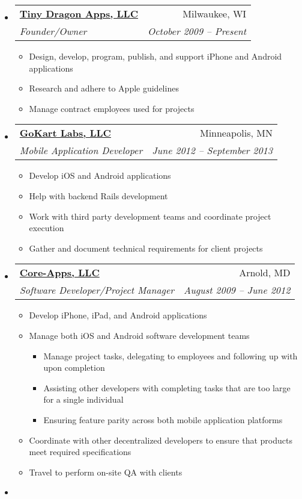 \documentclass[letterpaper,12pt]{article}
\makeatletter
\newcommand{\resitem}[1]{\item #1 \vspace{-2pt}}
\newcommand{\ressubheading}[4]{
      \begin{tabular*}{6.5in}{l@{\extracolsep{\fill}}r}
        \textbf{#1} & #2 \\
        \textit{#3} & \textit{#4} \\
      \end{tabular*}\vspace{-6pt}}
\makeatother
\begin{document}
\begin{itemize}
{\begin{itemize}
        \end{itemize}
         }
       \item
         \ressubheading{\href{http://itunes.apple.com/WebObjects/MZStore.woa/wa/viewArtist?id=337595590}{Tiny Dragon Apps, LLC}}{Milwaukee, WI}{Founder/Owner}{October 2009 -- Present}
        { \footnotesize
        \begin{itemize}
            \resitem{Design, develop, program, publish, and support iPhone and Android applications}
            \resitem{Research and adhere to Apple guidelines}
            \resitem{Manage contract employees used for projects}
        \end{itemize}
         }
       \item
         \ressubheading{\href{http://www.gokartlabs.com}{GoKart Labs, LLC}}{Minneapolis, MN}{Mobile Application Developer}{June 2012 -- September 2013}
        { \footnotesize
        \begin{itemize}
            \resitem{Develop iOS and Android applications}
            \resitem{Help with backend Rails development}
            \resitem{Work with third party development teams and coordinate project execution}
            \resitem{Gather and document technical requirements for client projects}
        \end{itemize}
         }
       \item
         \ressubheading{\href{http://www.core-apps.com/Home.html}{Core-Apps, LLC}}{Arnold, MD}{Software Developer/Project Manager}{August 2009 -- June 2012}
        { \footnotesize
        \begin{itemize}
            \resitem{Develop iPhone, iPad, and Android applications}
            \resitem{Manage both iOS and Android software development teams}
            \begin{itemize}
                \resitem{Manage project tasks, delegating to employees and following  up with upon completion}
                \resitem{Assisting other developers with completing tasks that are too large for a single individual}
                \resitem{Ensuring feature parity across both mobile application platforms}
            \end{itemize}
            \resitem{Coordinate with other decentralized developers to ensure that products meet required specifications}
            \resitem{Travel to perform on-site QA with clients}
        \end{itemize}
         }
       \item

\end{itemize}
\end{document}
